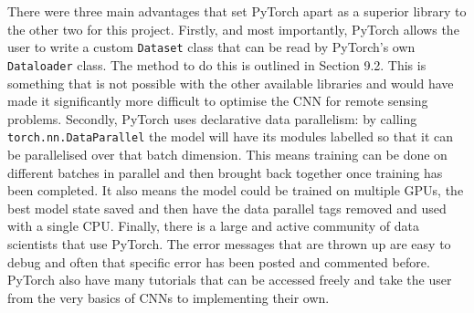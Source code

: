 There were three main advantages that set PyTorch apart as a superior library to the other two for this project. Firstly, and most importantly, PyTorch allows the user to write a custom \texttt{Dataset} class that can be read by PyTorch's own \texttt{Dataloader} class. The method to do this is outlined in Section 9.2. This is something that is not possible with the other available libraries and would have made it significantly more difficult to optimise the CNN for remote sensing problems.
Secondly, PyTorch uses declarative data parallelism: by calling \texttt{torch.nn.DataParallel} the model will have its modules labelled so that it can be parallelised over that batch dimension. This means training can be done on different batches in parallel and then brought back together once training has been completed. It also means the model could be trained on multiple GPUs, the best model state saved and then have the data parallel tags removed and used with a single CPU. Finally, there is a large and active community of data scientists that use  PyTorch. The error messages that are thrown up are easy to debug and often that specific error has been posted and commented before. PyTorch also have many tutorials that can be accessed freely and take the user from the very basics of CNNs to implementing their own.
